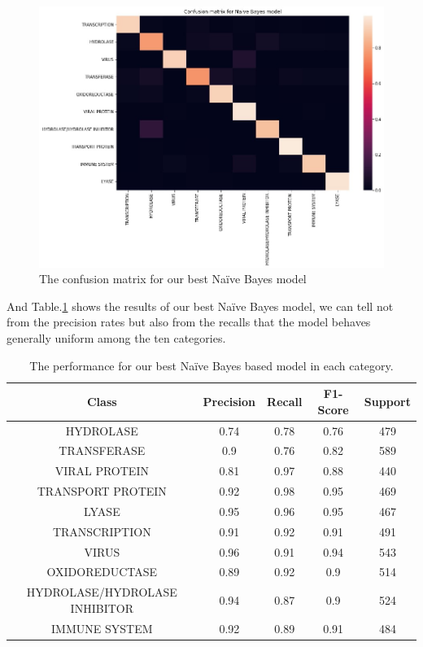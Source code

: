 \documentclass[sigconf]{acmart}
\begin{document}
\begin{figure}[h]
  \centering
  \includegraphics[width=\linewidth]{5.jpeg}
  \caption{The confusion matrix for our best Naïve Bayes model}
  \label{4}
\end{figure}

And Table.\ref{tab} shows the results of our best Naïve Bayes model, we can tell not from the precision rates but also from the recalls that the model behaves generally uniform among the ten categories.

\begin{table}
  \centering
  \caption{The performance for our best Naïve Bayes based model in each category.}
  \label{tab}
  \begin{tabular}{c|c|c|c|c}
    \toprule
    Class & Precision & Recall & F1-Score & Support \\
    \midrule
    HYDROLASE & 0.74 & 0.78 & 0.76 & 479\\
    TRANSFERASE & 0.9 & 0.76 & 0.82 & 589\\
    VIRAL PROTEIN & 0.81 & 0.97 & 0.88 & 440\\
    TRANSPORT PROTEIN & 0.92 & 0.98 & 0.95 & 469\\
    LYASE & 0.95 & 0.96 & 0.95 & 467\\
    TRANSCRIPTION & 0.91 & 0.92 & 0.91 & 491\\
    VIRUS & 0.96 & 0.91 & 0.94 & 543\\
    OXIDOREDUCTASE & 0.89 & 0.92 & 0.9 & 514\\
    HYDROLASE/HYDROLASE INHIBITOR & 0.94 & 0.87 & 0.9 & 524\\
    IMMUNE SYSTEM & 0.92 & 0.89 & 0.91 & 484\\  
  \bottomrule
\end{tabular}
\end{table}
\end{document}
